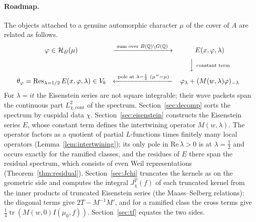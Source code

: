 \paragraph{Roadmap.} The objects attached to a genuine automorphic
character $\mu$ of the cover of $A$ are related as follows.
\[
\begin{array}{ccc}
\varphi\in\mathcal H_B(\mu)
 & \xrightarrow{\ \text{sum over }B(\mathbb{Q})\backslash G(\mathbb{Q})\ }
 & E(x,\varphi,\lambda)\\[6pt]
 & & \Big\downarrow{\scriptstyle\ \text{constant term}}\\[6pt]
\theta_\varphi=\operatorname{Res}_{\lambda=1/2}E(x,\varphi,\lambda)\in V_b
 & \xleftarrow{\ \text{pole at }\lambda=\frac12\ (\mu^w=\mu)\ }
 & \varphi_\lambda+(M(w,\lambda)\varphi)_{-\lambda}
\end{array}
\]
For $\lambda=it$ the Eisenstein series are not square integrable; their
wave packets span the continuous part $L^2_{\chi,\mathrm{cont}}$ of the
spectrum.
Section~\ref{sec:decomp} sorts the spectrum by cuspidal data $\chi$.
Section~\ref{sec:eisenstein} constructs the Eisenstein series $E$, whose
constant term defines the intertwining operator $M(w,\lambda)$. The operator factors as a quotient of partial
$L$-functions times finitely many local operators
(Lemma~\ref{lem:intertwining}); its only pole in $\mathrm{Re}\,\lambda>0$
is at $\lambda=\frac12$ and occurs exactly for the ramified classes, and
the residues of $E$ there span the residual spectrum, which consists of
even Weil representations (Theorem~\ref{thm:residual}).
Section~\ref{sec:Jchi} truncates the kernels as on the geometric side and
computes the integral $J^T_\chi(f)$ of each truncated kernel from the
inner products of truncated Eisenstein series (the Maass--Selberg
relations): the diagonal terms give $2T-M^{-1}M'$, and for a ramified
class the cross terms give $\frac14\operatorname{tr}(M(w,0)I(\mu_0,f))$.
Section~\ref{sec:tf} equates the two sides.

